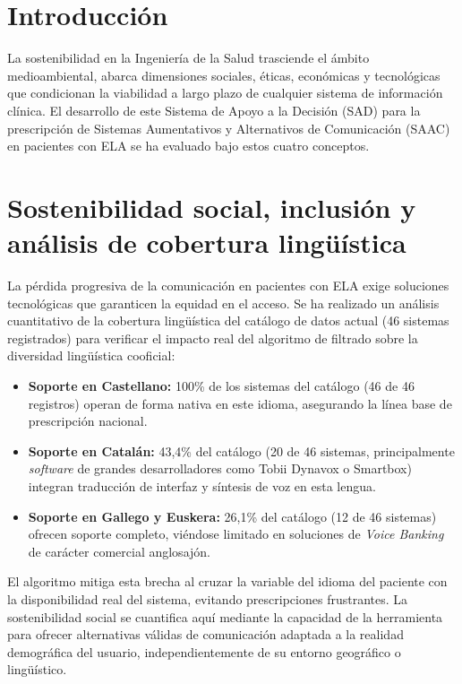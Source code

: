 
\section{Introducción}
La sostenibilidad en la Ingeniería de la Salud trasciende el ámbito medioambiental, abarca dimensiones sociales, éticas, económicas y tecnológicas que condicionan la viabilidad a largo plazo de cualquier sistema de información clínica. El desarrollo de este Sistema de Apoyo a la Decisión (SAD) para la prescripción de Sistemas Aumentativos y Alternativos de Comunicación (SAAC) en pacientes con ELA se ha evaluado bajo estos cuatro conceptos.

\section{Sostenibilidad social, inclusión y análisis de cobertura lingüística}
La pérdida progresiva de la comunicación en pacientes con ELA exige soluciones tecnológicas que garanticen la equidad en el acceso. Se ha realizado un análisis cuantitativo de la cobertura lingüística del catálogo de datos actual (46 sistemas registrados) para verificar el impacto real del algoritmo de filtrado sobre la diversidad lingüística cooficial:

\begin{itemize}
    \item \textbf{Soporte en Castellano:} 100\% de los sistemas del catálogo (46 de 46 registros) operan de forma nativa en este idioma, asegurando la línea base de prescripción nacional.
    \item \textbf{Soporte en Catalán:} 43,4\% del catálogo (20 de 46 sistemas, principalmente \textit{software} de grandes desarrolladores como Tobii Dynavox o Smartbox) integran traducción de interfaz y síntesis de voz en esta lengua.
    \item \textbf{Soporte en Gallego y Euskera:} 26,1\% del catálogo (12 de 46 sistemas) ofrecen soporte completo, viéndose limitado en soluciones de \textit{Voice Banking} de carácter comercial anglosajón.
\end{itemize}

El algoritmo mitiga esta brecha al cruzar la variable del idioma del paciente con la disponibilidad real del sistema, evitando prescripciones frustrantes. La sostenibilidad social se cuantifica aquí mediante la capacidad de la herramienta para ofrecer alternativas válidas de comunicación adaptada a la realidad demográfica del usuario, independientemente de su entorno geográfico o lingüístico.

